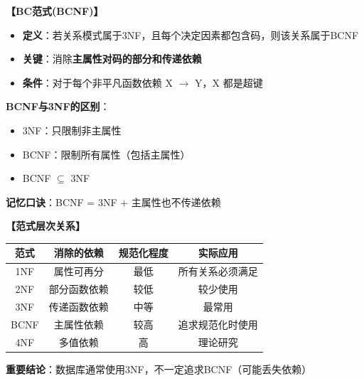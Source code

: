 \documentclass[12pt, a4paper]{article}
\newenvironment{bluebox}[1]{%
  \begin{trivlist}
  \item[\hskip\labelsep \textbf{#1}]
  \setlength{\parskip}{0.5ex}
  \setlength{\itemsep}{0.5ex}
}{%
  \end{trivlist}
  }
\begin{document}
\begin{bluebox}{BCNF定义}
	\textbf{【BC范式(BCNF)】}

	\begin{itemize}[leftmargin=*, nosep]
		\item \textbf{定义}：若关系模式属于3NF，且每个决定因素都包含码，则该关系属于BCNF
		\item \textbf{关键}：消除\textbf{主属性对码的部分和传递依赖}
		\item \textbf{条件}：对于每个非平凡函数依赖 X $\to$ Y，X 都是超键
	\end{itemize}

	\textbf{BCNF与3NF的区别}：
	\begin{itemize}
		\item 3NF：只限制非主属性
		\item BCNF：限制所有属性（包括主属性）
		\item BCNF $\subseteq$ 3NF
	\end{itemize}

	\textbf{记忆口诀}：BCNF = 3NF + 主属性也不传递依赖
\end{bluebox}

\begin{bluebox}{范式层次}
	\textbf{【范式层次关系】}

	\begin{tabular}{|c|c|c|c|}
		\hline
		\textbf{范式} & \textbf{消除的依赖} & \textbf{规范化程度} & \textbf{实际应用} \\
		\hline
		1NF         & 属性可再分          & 最低             & 所有关系必须满足      \\
		\hline
		2NF         & 部分函数依赖         & 较低             & 较少使用          \\
		\hline
		3NF         & 传递函数依赖         & 中等             & 最常用           \\
		\hline
		BCNF        & 主属性依赖          & 较高             & 追求规范化时使用      \\
		\hline
		4NF         & 多值依赖           & 高              & 理论研究          \\
		\hline
	\end{tabular}

	\textbf{重要结论}：数据库通常使用3NF，不一定追求BCNF（可能丢失依赖）
\end{bluebox}
\end{document}

